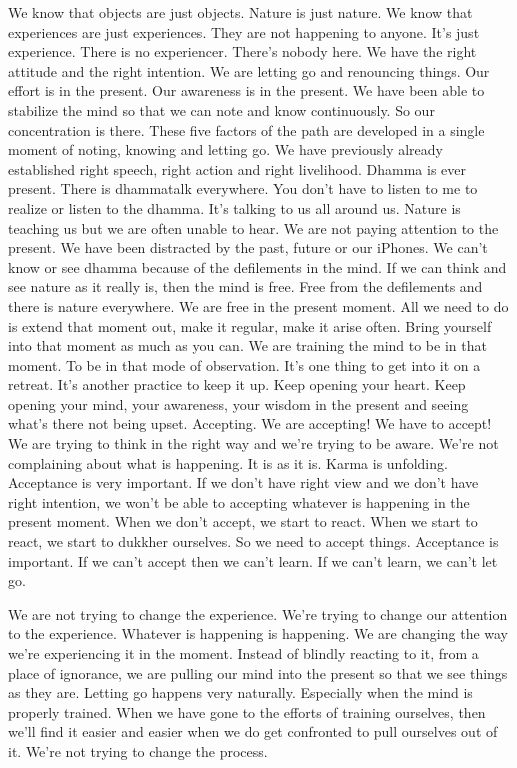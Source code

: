 \documentclass[letterpaper,10pt,english]{sphinxmanual}
\begin{document}
\sphinxAtStartPar
We know that objects are just objects. Nature is just nature. We know
that  experiences  are  just  experiences.  They  are  not  happening  to  anyone.
It’s just experience. There is no experiencer. There’s nobody here. We have
the right attitude and the right intention. We are letting go and renouncing
things. Our effort is in the present. Our awareness is in the present. We have
been able to stabilize the mind so that we can note and know continuously.
So our concentration is there. These five factors of the path are developed
in a single moment of noting, knowing and letting go. We have previously
already  established  right  speech,  right  action  and  right  livelihood.
Dhamma is ever present. There is dhamma\sphinxhyphen{}talk everywhere. You don’t have
to listen to me to realize or listen to the dhamma. It’s talking to us all around
us. Nature is teaching us but we are often unable to hear. We are not paying
attention to the present. We have been distracted by the past, future or our
iPhones. We  can’t  know  or  see  dhamma  because  of  the  defilements  in  the
mind. If we can think and see nature as it really is, then the mind is free. Free
from the defilements and there is nature everywhere. We are free in the present moment. All we need to do is extend that moment out, make it regular,
make it arise often. Bring yourself into that moment as much as you can. We
are training the mind to be in that moment. To be in that mode of observation. It’s one thing to get into it on a retreat. It’s another practice to keep it
up.  Keep  opening  your  heart.  Keep  opening  your  mind,  your  awareness,
your wisdom in the present and seeing what’s there not being upset. Accepting. We are accepting! We have to accept! We are trying to think in the right
way  and  we’re  trying  to  be  aware.  We’re  not  complaining  about  what  is
happening. It is as it is. Karma is unfolding. Acceptance is very important.
If we don’t have right view and we don’t have right intention, we won’t be
able to accepting whatever is happening in the present moment. When we
don’t accept, we start to react. When we start to react, we start to dukkher
ourselves. So we need to accept things. Acceptance is important. If we can’t
accept then we can’t learn. If we can’t learn, we can’t let go.

\sphinxAtStartPar
We are not trying to change the experience. We’re trying to change our
attention  to  the  experience.  Whatever  is  happening  is  happening.  We  are
  changing  the  way  we’re  experiencing  it  in  the  moment.  Instead  of  blindly
reacting to it, from a place of ignorance, we are pulling our mind into the
present so that we see things as they are. Letting go happens very naturally.
Especially  when  the  mind  is  properly  trained. When  we  have  gone  to  the
efforts  of  training  ourselves,  then  we’ll  find  it  easier  and  easier  when  we
do get confronted to pull ourselves out of it. We’re not trying to change the
process.
\end{document}
